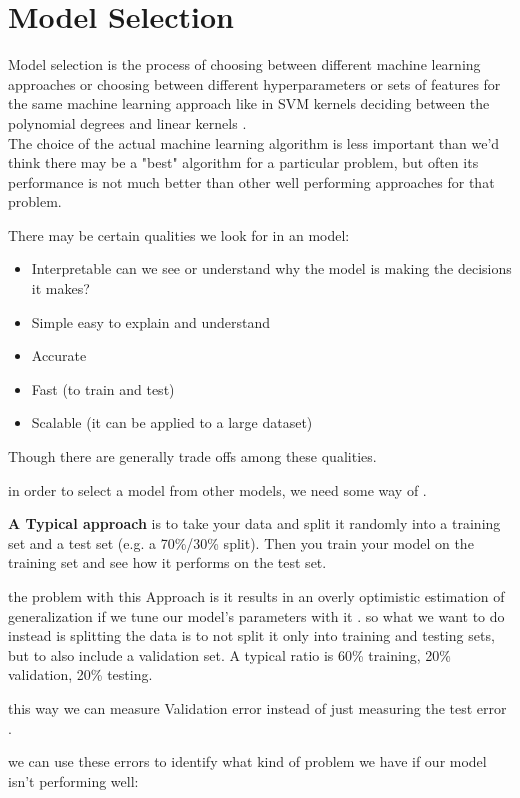 \section{Model Selection } \label{ms}
Model selection is the process of choosing between different machine learning approaches  or choosing between different hyperparameters or sets of features for the same machine learning approach  like in SVM kernels deciding between the polynomial degrees and  linear kernels .\\
The choice of the actual machine learning algorithm is less important than we'd think  there may be a "best" algorithm for a particular problem, but often its performance is not much better than other well performing approaches for that problem.

There may be certain qualities we look for in an model:

\begin{itemize}
\item Interpretable   can we see or understand why the model is making the decisions it makes?
\item Simple   easy to explain and understand
\item Accurate
\item Fast (to train and test)
\item Scalable (it can be applied to a large dataset)

\end{itemize}
Though there are generally trade offs among these qualities.

in order to select a model from other models, we need some way of  .


\textbf{A Typical approach } is to take your data and split it randomly into a training set and a test set (e.g. a 70\%/30\% split). Then you train your model on the training set and see how it performs on the test set.

the problem with this Approach is it results in an overly optimistic estimation of generalization if we tune our model's parameters with it . so what we want to do instead is splitting the data is to not split it only into training and testing sets, but to also include a validation set. A typical ratio is 60\% training, 20\% validation, 20\% testing.

this way we can measure Validation error instead of just measuring the test error .

we can use these errors   to identify what kind of problem we have if our model isn't performing well:

